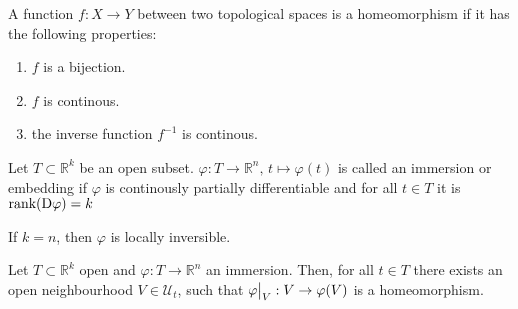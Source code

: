 \begin{definition}[Homeomorphism]
    A function \(f: X \rightarrow Y\) between two topological spaces is a homeomorphism if it has the following properties:
    \begin{enumerate}
        \item \(f\) is a bijection.
        \item \(f\) is continous.
        \item the inverse function \(f^{-1}\) is continous.
    \end{enumerate}
\end{definition}

\begin{definition}[Immersion]
    Let \(T \subset \mathbb{R}^k\) be an open subset. \(\varphi: T \rightarrow \mathbb{R}^n, \, t \mapsto \varphi(t)\) is called an immersion or embedding if \(\varphi\) is continously partially differentiable and for all \(t \in T\) it is \(\text{rank}( \mathop{}\!\mathrm{D} \varphi) = k\)
\end{definition}
\begin{remark}
    If \(k = n\), then \(\varphi\) is locally inversible.
\end{remark}

\begin{theorem}
    Let \(T \subset \mathbb{R}^k\) open and \(\varphi: T \rightarrow \mathbb{R}^n\) an immersion. Then, for all \(t \in T\) there exists an open neighbourhood \(V \in \mathcal{U}_t\), such that \(\restr{\varphi}{V}: V \rightarrow \varphi(V)\) is a homeomorphism.
\end{theorem}



